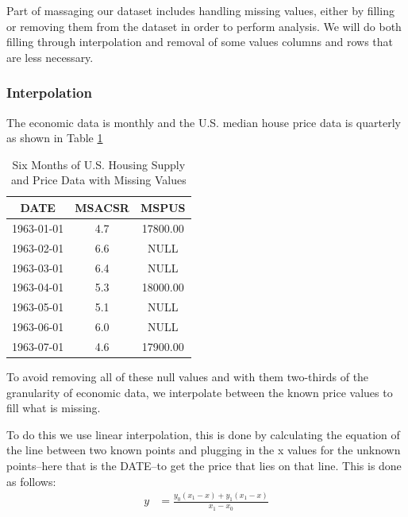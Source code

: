\documentclass [MS] {uclathes}
\begin{document}
Part of massaging our dataset includes handling missing values, either by filling or removing them from the dataset in order to perform analysis. We will do both filling through interpolation and removal of some values columns and rows that are less necessary.

\subsubsection{Interpolation}
The economic data is monthly and the U.S. median house price data is quarterly as shown in Table \ref{tab:Before_Interpolation}

\begin{table}[H]
\centering
\renewcommand{\arraystretch}{0.75}
\caption{Six Months of U.S. Housing Supply and Price Data with Missing Values}
\label{tab:Before_Interpolation}
\begin{tabular}{c|c|c} \hline
\textbf{DATE}   & \textbf{MSACSR}     & \textbf{MSPUS}  \\ 
\hline \hline
1963-01-01      & 4.7                 & 17800.00        \\
1963-02-01      & 6.6                 & NULL            \\
1963-03-01      & 6.4                 & NULL            \\
1963-04-01      & 5.3                 & 18000.00        \\
1963-05-01      & 5.1                 & NULL            \\
1963-06-01      & 6.0                 & NULL            \\
1963-07-01      & 4.6                 & 17900.00        \\
\hline
\end{tabular}
\end{table}

To avoid removing all of these null values and with them two-thirds of the granularity of economic data, we interpolate between the known price values to fill what is missing.

To do this we use linear interpolation, this is done by calculating the equation of the line between two known points and plugging in the x values for the unknown points--here that is the DATE--to get the price that lies on that line. This is done as follows:
$$
\begin{aligned}
y &= \frac{y_{0}\left(x_{1} - x \right) + y_{1}\left(x_{1} - x \right)}{x_{1} - x_{0}} \\
\end{aligned}
$$
\end{document}
